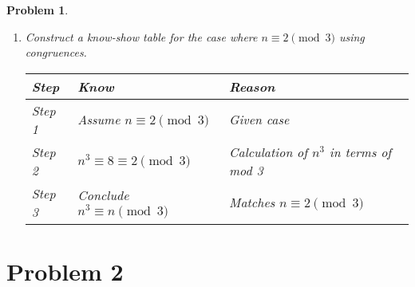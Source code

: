 \documentclass[12pt]{article}
\newtheorem{problem}{Problem}
\theoremstyle{definition}
\begin{document}
\begin{problem}
\begin{enumerate}[label=(\alph*)]
    \item Construct a know-show table for the case where \( n \equiv 2 \pmod{3} \) using congruences.
    
    \begin{center}
        \begin{tabular}{|p{}|p{}|p{}|}
        \hline
        \textbf{Step} & \textbf{Know} & \textbf{Reason} \\
        \hline
        Step 1 & Assume \( n \equiv 2 \pmod{3} \) & Given case \\
        \hline
        Step 2 & \( n^3 \equiv 8 \equiv 2 \pmod{3} \) & Calculation of \( n^3 \) in terms of mod 3 \\
        \hline
        Step 3 & Conclude \( n^3 \equiv n \pmod{3} \) & Matches \( n \equiv 2 \pmod{3} \) \\
        \hline
        \end{tabular}
    \end{center}
\end{enumerate}
\end{problem}

\bigskip

\section*{Problem 2}
\end{document}
